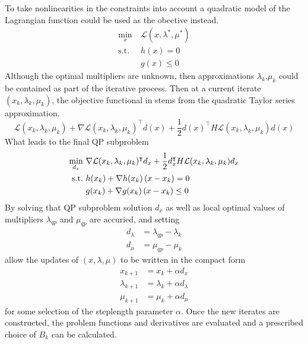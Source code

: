 To take nonlinearities in the constraints into account a quadratic model of the Lagrangian function could be used as the obective instead.
\begin{subequations}
	\begin{align}
	\min_{x}\  & \mathcal{L}(x,\lambda^*,\mu^*)\\
	\text{s.t.}\  &h(x)= 0\\
	&g(x)\leq 0
	\end{align}
\end{subequations}
Although the optimal multipliers are unknown, then approximations $\lambda_k$,$\mu_k$ could be contained as part of the iterative process. Then at a current iterate $(x_k,\lambda_k,\mu_k)$, the objective functional in stems from the quadratic Taylor series approximation.
\begin{equation}
	\mathcal{L}(x_k,\lambda_k,\mu_k)+\nabla\mathcal{L}(x_k,\lambda_k,\mu_k)^\intercal d(x)+\frac{1}{2}d(x)^\intercal H\mathcal{L}(x_k,\lambda_k,\mu_k) d(x)
\end{equation}
What leads to the final QP subproblem
\begin{subequations}
	\begin{align}
	\min_{d_x}\  &\nabla \mathcal{L}(x_k,\lambda_k,\mu_k)^\intercal d_x+\frac{1}{2}d_x^\intercal H\mathcal{L}(x_k,\lambda_k,\mu_k)d_x\\
	\text{s.t.}\  &h(x_k)+\nabla h(x_k)\left( x-x_k \right) = 0\\
	&g(x_k)+\nabla g(x_k)\left( x-x_k \right)\leq 0
	\end{align}
\end{subequations}
By solving that QP subproblem solution $d_x$ as well as local optimal values of multipliers $\lambda_{qp}$ and $\mu_{qp}$ are accuried, and setting 
\begin{subequations}
	\begin{align}
		d_\lambda &= \lambda_{qp}-\lambda_k\\
		d_\mu &= \mu_{qp}-\mu_k
	\end{align}
\end{subequations}
allow the updates of $(x,\lambda,\mu)$ to be written in the compact form
\begin{subequations}
	\begin{align}
	x_{k+1} &= x_k + \alpha d_x\\
	\lambda_{k+1} &= \lambda_k + \alpha d_\lambda\\
	\mu_{k+1} &= \mu_k + \alpha d_\mu
	\end{align}
\end{subequations}
for some selection of the steplength parameter $\alpha$. Once the new iterates are constructed, the problem functions and derivatives are evaluated and a
prescribed choice of $B_k$ can be calculated.

